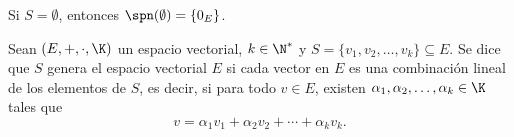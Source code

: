 \documentclass[compacto,10pt]{pubciencias-notas}
\begin{document}

\begin{obs}
    Si $S = \emptyset$, entonces
    $\spn(\emptyset) = \{ 0_{E} \}$.
\end{obs}


\begin{defi} 
Sean $(E,+,\cdot,\K)$ un espacio vectorial, $k\in\N^{*}$ y $S=\{v_1,v_2,\ldots,v_k\}\subseteq E$. 
Se dice que $S$ genera el espacio vectorial $E$ si cada vector en $E$ es una combinación lineal de los 
elementos de $S$, es decir, si para todo $v\in E$, existen  $\alpha_1, \alpha_2, \ldots, \alpha_k\in \K$ 
tales que 
    \[
        v = \alpha_1v_1+ \alpha_2v_2+ \cdots+ \alpha_k v_k.
    \]
\end{defi}
\end{document}
